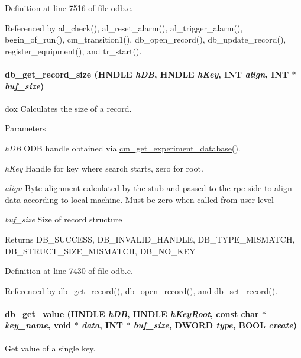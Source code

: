 Definition at line 7516 of file odb.c.

Referenced by al\_\-check(), al\_\-reset\_\-alarm(), al\_\-trigger\_\-alarm(), begin\_\-of\_\-run(), cm\_\-transition1(), db\_\-open\_\-record(), db\_\-update\_\-record(), register\_\-equipment(), and tr\_\-start().
\paragraph[{db\_\-get\_\-record\_\-size}]{ db\_\-get\_\-record\_\-size (HNDLE {\em hDB}, \/  HNDLE {\em hKey}, \/  {\bf INT} {\em align}, \/  {\bf INT} $\ast$ {\em buf\_\-size})}\hfill\label{group__odbfunctionc_ga70b171dc66b0673fc9ed773fca31b7dc}
dox Calculates the size of a record. 
\begin{DoxyParams}{Parameters}
\item[{\em hDB}]ODB handle obtained via \hyperlink{group__cmfunctionc_ga16b33b70783a3f5ba98b4094149d12b7}{cm\_\-get\_\-experiment\_\-database()}. \item[{\em hKey}]Handle for key where search starts, zero for root. \item[{\em align}]Byte alignment calculated by the stub and passed to the rpc side to align data according to local machine. Must be zero when called from user level \item[{\em buf\_\-size}]Size of record structure \end{DoxyParams}
\begin{DoxyReturn}{Returns}
DB\_\-SUCCESS, DB\_\-INVALID\_\-HANDLE, DB\_\-TYPE\_\-MISMATCH, DB\_\-STRUCT\_\-SIZE\_\-MISMATCH, DB\_\-NO\_\-KEY 
\end{DoxyReturn}


Definition at line 7430 of file odb.c.

Referenced by db\_\-get\_\-record(), db\_\-open\_\-record(), and db\_\-set\_\-record().
\paragraph[{db\_\-get\_\-value}]{ db\_\-get\_\-value (HNDLE {\em hDB}, \/  HNDLE {\em hKeyRoot}, \/  const char $\ast$ {\em key\_\-name}, \/  void $\ast$ {\em data}, \/  {\bf INT} $\ast$ {\em buf\_\-size}, \/  {\bf DWORD} {\em type}, \/  {\bf BOOL} {\em create})}\hfill\label{group__odbfunctionc_gaf3958854e073e1ddbb43324e07a6287f}
Get value of a single key.

